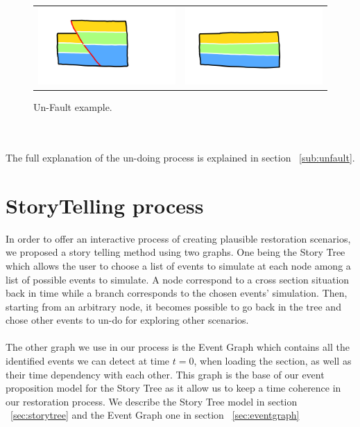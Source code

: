 \documentclass[12pt, a4paper]{report} %
\begin{document}
\begin{figure}[H]
\centering
\begin{tabular}{@{}cc@{}}
\includegraphics[width=.35\textwidth]{unFaultDescription0.png}&
\includegraphics[width=.35\textwidth]{unFaultDescription1.png}\\
\end{tabular}
\caption{Un-Fault example.}
\label{unfaulteg}
\end{figure}\\\\
The full explanation of the un-doing process is explained in section ~\ref{sub:unfault}.

\section{StoryTelling process}
\label{sub:storytel}
In order to offer an interactive process of creating plausible restoration scenarios, we proposed a story telling method using two graphs. One being the Story Tree which allows the user to choose a list of events to simulate at each node among a list of possible events to simulate. A node correspond to a cross section situation back in time while a branch corresponds to the chosen events' simulation. Then, starting from an arbitrary node, it becomes possible to go back in the tree and chose other events to un-do for exploring other scenarios.\\\\
The other graph we use in our process is the Event Graph which contains all the identified events we can detect at time $t = 0$, when loading the section, as well as their time dependency with each other. This graph is the base of our event proposition model for the Story Tree as it allow us to keep a time coherence in our restoration process. We describe the Story Tree model in section ~\ref{sec:storytree} and the Event Graph one in section ~\ref{sec:eventgraph}
\end{document}
